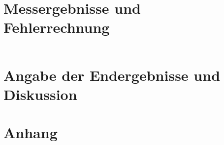 \documentclass[12pt,a4paper]{article}
\begin{document}
\section{Messergebnisse und Fehlerrechnung}
	\begin{equation} %
	\end{equation}
\section{Angabe der Endergebnisse und Diskussion}

\newpage %
\printbibliography %
\newpage 
{} %
\section{Anhang}
\end{document}
